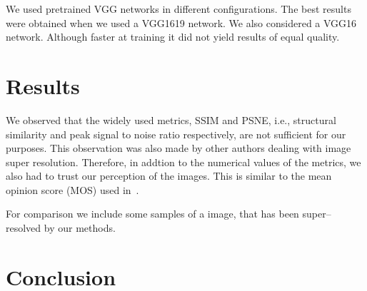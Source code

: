 \documentclass[10pt,twocolumn,letterpaper]{article}
\begin{document}
We used pretrained VGG networks in different configurations. The best
results were obtained when we used a VGG1619 network. We also
considered a VGG16 network. Although faster at training it did not
yield results of equal quality.


\section{Results}
\label{sec:results}


We observed that the widely used metrics, SSIM and PSNE, i.\;e.,
structural similarity and peak signal to noise ratio respectively, are
not sufficient for our purposes. This observation was also made by
other authors dealing with image super resolution. Therefore, in
addtion to the numerical values of the metrics, we also had to trust
our perception of the images. This is similar to the mean opinion
score (MOS) used in~\cite{LedigChristian2016PSIS}.

For comparison we include some samples of a image, that has been
super--resolved by our methods.


\section{Conclusion}
\label{sec:conclusion}


\appendix

{
  \nocite{*}                      %
  \small
  
  
  
}
\end{document}
